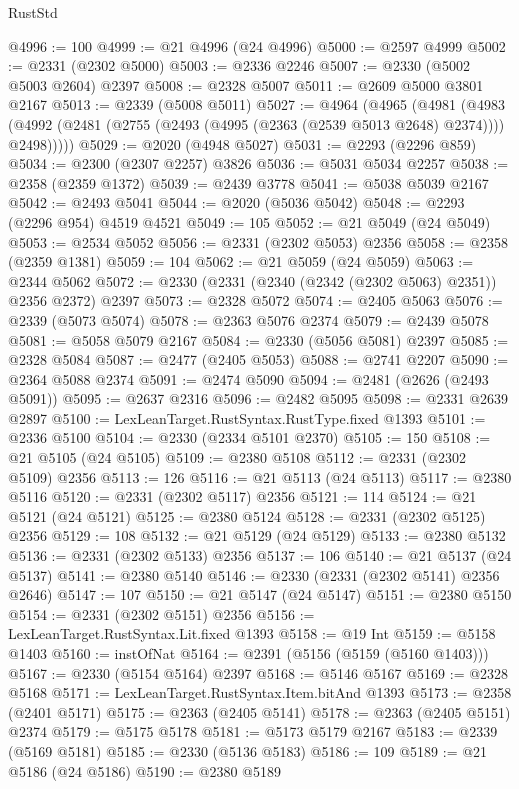 \begin{lexlean}{RustStd}
\begin{coremodule}
@4996 := 100
@4999 := @21 @4996 (@24 @4996)
@5000 := @2597 @4999
@5002 := @2331 (@2302 @5000)
@5003 := @2336 @2246
@5007 := @2330 (@5002 @5003 @2604) @2397
@5008 := @2328 @5007
@5011 := @2609 @5000 @3801 @2167
@5013 := @2339 (@5008 @5011)
@5027 := @4964
    (@4965
      (@4981
        (@4983 (@4992 (@2481 (@2755 (@2493 (@4995 (@2363 (@2539 @5013 @2648) @2374)))) @2498)))))
@5029 := @2020 (@4948 @5027)
@5031 := @2293 (@2296 @859)
@5034 := @2300 (@2307 @2257) @3826
@5036 := @5031 @5034 @2257
@5038 := @2358 (@2359 @1372)
@5039 := @2439 @3778
@5041 := @5038 @5039 @2167
@5042 := @2493 @5041
@5044 := @2020 (@5036 @5042)
@5048 := @2293 (@2296 @954) @4519 @4521
@5049 := 105
@5052 := @21 @5049 (@24 @5049)
@5053 := @2534 @5052
@5056 := @2331 (@2302 @5053) @2356
@5058 := @2358 (@2359 @1381)
@5059 := 104
@5062 := @21 @5059 (@24 @5059)
@5063 := @2344 @5062
@5072 := @2330 (@2331 (@2340 (@2342 (@2302 @5063) @2351)) @2356 @2372) @2397
@5073 := @2328 @5072
@5074 := @2405 @5063
@5076 := @2339 (@5073 @5074)
@5078 := @2363 @5076 @2374
@5079 := @2439 @5078
@5081 := @5058 @5079 @2167
@5084 := @2330 (@5056 @5081) @2397
@5085 := @2328 @5084
@5087 := @2477 (@2405 @5053)
@5088 := @2741 @2207
@5090 := @2364 @5088 @2374
@5091 := @2474 @5090
@5094 := @2481 (@2626 (@2493 @5091))
@5095 := @2637 @2316
@5096 := @2482 @5095
@5098 := @2331 @2639 @2897
@5100 := LexLeanTarget.RustSyntax.RustType.fixed @1393
@5101 := @2336 @5100
@5104 := @2330 (@2334 @5101 @2370)
@5105 := 150
@5108 := @21 @5105 (@24 @5105)
@5109 := @2380 @5108
@5112 := @2331 (@2302 @5109) @2356
@5113 := 126
@5116 := @21 @5113 (@24 @5113)
@5117 := @2380 @5116
@5120 := @2331 (@2302 @5117) @2356
@5121 := 114
@5124 := @21 @5121 (@24 @5121)
@5125 := @2380 @5124
@5128 := @2331 (@2302 @5125) @2356
@5129 := 108
@5132 := @21 @5129 (@24 @5129)
@5133 := @2380 @5132
@5136 := @2331 (@2302 @5133) @2356
@5137 := 106
@5140 := @21 @5137 (@24 @5137)
@5141 := @2380 @5140
@5146 := @2330 (@2331 (@2302 @5141) @2356 @2646)
@5147 := 107
@5150 := @21 @5147 (@24 @5147)
@5151 := @2380 @5150
@5154 := @2331 (@2302 @5151) @2356
@5156 := LexLeanTarget.RustSyntax.Lit.fixed @1393
@5158 := @19 Int
@5159 := @5158 @1403
@5160 := instOfNat
@5164 := @2391 (@5156 (@5159 (@5160 @1403)))
@5167 := @2330 (@5154 @5164) @2397
@5168 := @5146 @5167
@5169 := @2328 @5168
@5171 := LexLeanTarget.RustSyntax.Item.bitAnd @1393
@5173 := @2358 (@2401 @5171)
@5175 := @2363 (@2405 @5141)
@5178 := @2363 (@2405 @5151) @2374
@5179 := @5175 @5178
@5181 := @5173 @5179 @2167
@5183 := @2339 (@5169 @5181)
@5185 := @2330 (@5136 @5183)
@5186 := 109
@5189 := @21 @5186 (@24 @5186)
@5190 := @2380 @5189

\end{coremodule}
\end{lexlean}
